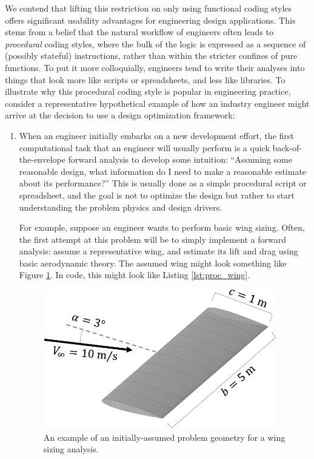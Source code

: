 We contend that lifting this restriction on only using functional coding styles offers significant usability advantages for engineering design applications. This stems from a belief that the natural workflow of engineers often leads to \emph{procedural} coding styles, where the bulk of the logic is expressed as a sequence of (possibly stateful) instructions, rather than within the stricter confines of pure functions. To put it more colloquially, engineers tend to write their analyses into things that look more like scripts or spreadsheets, and less like libraries. To illustrate why this procedural coding style is popular in engineering practice, consider a representative hypothetical example of how an industry engineer might arrive at the decision to use a design optimization framework:

\begin{enumerate}
    \item When an engineer initially embarks on a new development effort, the first computational task that an engineer will usually perform is a quick back-of-the-envelope forward analysis to develop some intuition: ``Assuming some reasonable design, what information do I need to make a reasonable estimate about its performance?'' This is usually done as a simple procedural script or spreadsheet, and the goal is not to optimize the design but rather to start understanding the problem physics and design drivers.

    For example, suppose an engineer wants to perform basic wing sizing. Often, the first attempt at this problem will be to simply implement a forward analysis: assume a representative wing, and estimate its lift and drag using basic aerodynamic theory. The assumed wing might look something like Figure \ref{fig:proc_wing}. In code, this might look like Listing \ref{lst:proc_wing}.

    \begin{figure}[H]
        \centering
        \includegraphics[width=4in]{../figures/wing_proc-crop.pdf}
        \caption{An example of an initially-assumed problem geometry for a wing sizing analysis.}
        \label{fig:proc_wing}
    \end{figure}


\end{enumerate}
